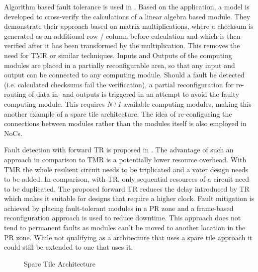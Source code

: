 Algorithm based fault tolerance is used in \cite{davis2014}.
Based on the application, a model is developed to cross-verify the calculations of a linear algebra based module. 
They demonstrate their approach based on matrix multiplications, where a checksum is generated as an additional row / column before calculation and which is then verified after it has been transformed by the multiplication.
This removes the need for \gls{TMR} or similar techniques.
Inputs and Outputs of the computing modules are placed in a partially reconfigurable area, so that any input and output can be connected to any computing module.  
Should a fault be detected (i.e. calculated checksums fail the verification), a partial reconfiguration for re-routing of data in- and outputs is triggered in an attempt to avoid the faulty computing module. 
This requires \textit{N+1} available computing modules, making this another example of a spare tile architecture.
The idea of re-configuring the connections between modules rather than the modules itself is also employed in \glspl{NoC}.

Fault detection with forward \gls{TR} is proposed in \cite{frenkel2015}.
The advantage of such an approach in comparison to \gls{TMR} is a potentially lower resource overhead.
With \gls{TMR} the whole resilient circuit needs to be triplicated and a voter design needs to be added.
In comparison, with \gls{TR}, only sequential resources of a circuit need to be duplicated.
The proposed forward \gls{TR} reduces the delay introduced by \gls{TR} which makes it suitable for designs that require a higher clock. 
Fault mitigation is achieved by placing fault-tolerant modules in a \gls{PR} zone and a frame-based reconfiguration approach is used to reduce downtime.
This approach does not tend to permanent faults as modules can't be moved to another location in the \gls{PR} zone. 
While not qualifying as a architecture that uses a spare tile approach it could still be extended to one that uses it. 

\begin{center}
\begin{figure}[h]
    \centering
    \resizebox{\columnwidth}{!} {
        
    }
\caption{Spare Tile Architecture}
\label{fig:SpareTileArchitecture}
\end{figure}
\end{center}
